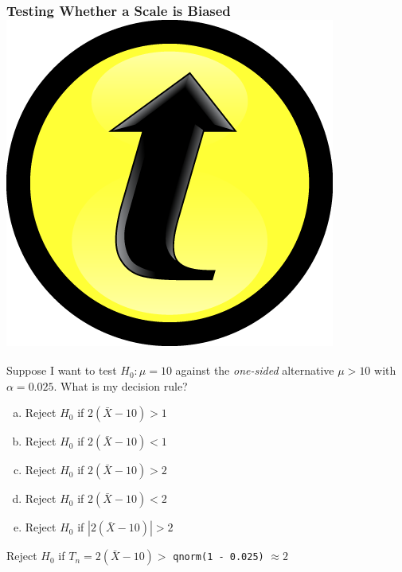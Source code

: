 \documentclass[handout]{beamer}
\begin{document}
\begin{frame}[t]
	\frametitle{Testing Whether a Scale is Biased \hfill \includegraphics[scale = 0.05]{./images/clicker}}

	\vspace{1em}

	Suppose I want to test $H_0\colon \mu = 10$ against the \emph{one-sided} alternative $\mu > 10$ with $\alpha = 0.025$. What is my decision rule? 

	\vspace{1em}

	\begin{enumerate}[(a)]
		\item Reject $H_0$ if $2(\bar{X} - 10) > 1$ 
		\item Reject $H_0$ if $2(\bar{X} - 10) < 1$ 
		\item Reject $H_0$ if $2(\bar{X} - 10) > 2$ 
		\item Reject $H_0$ if $2(\bar{X} - 10) < 2$ 
		\item Reject $H_0$ if $|2(\bar{X} - 10)| > 2$ 
	\end{enumerate}

	\pause
	\alert{Reject $H_0$ if $T_n = 2(\bar{X} - 10) >$ \texttt{qnorm(1 - 0.025)} $\approx 2$}
\end{frame}
\end{document}
